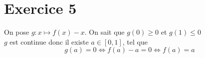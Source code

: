 \part{Exercice 5}

On pose $g: x \mapsto f(x) - x$. On sait que $g(0)\ge 0$ et $g(1)\le 0$\\
$g$ est continue donc il existe $a \in [0,1]$, tel que \[
	g(a) = 0 \iff f(a) - a = 0 \iff f(a) = a
\] 
